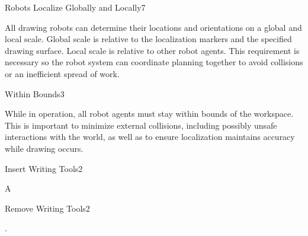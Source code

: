 \begin{functional_requirement}{Robots Localize Globally and Locally}{7}
\label{fr:localize}
\item All drawing robots can determine their locations and orientations on a global and local scale. Global scale is relative to the localization markers and the specified drawing surface. Local scale is relative to other robot agents. This requirement is necessary so the robot system can coordinate planning together to avoid collisions or an inefficient spread of work. 
\end{functional_requirement}

\begin{functional_requirement}{Within Bounds}{3}
\label{fr:in_bounds}
\item While in operation, all robot agents must stay within bounds of the workspace. This is important to minimize external collisions, including possibly unsafe interactions with the world, as well as to ensure localization maintains accuracy while drawing occurs.
\end{functional_requirement}


\begin{functional_requirement}{Insert Writing Tools}{2}
\label{fr:insert_tool}
\item A
\end{functional_requirement}

\begin{functional_requirement}{Remove Writing Tools}{2}
\label{fr:remove_tool}
\item .
\end{functional_requirement}

